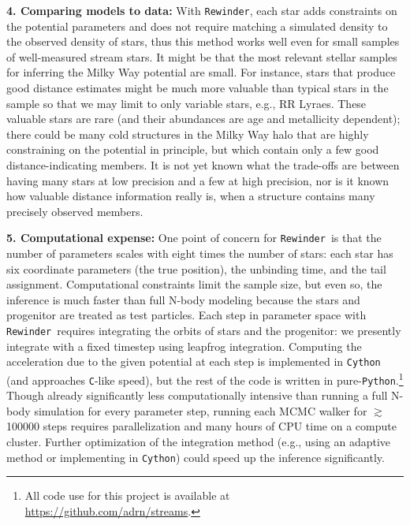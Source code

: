 \documentclass[letterpaper,12pt,preprint]{aastex}
\newcommand{\rewinder}{\texttt{Rewinder}}
\begin{document}
{\bf 4. Comparing models to data:} With \rewinder, each star adds constraints on the potential parameters and does not require matching a simulated density to the observed density of stars, thus this method works well even for small samples of well-measured stream stars. It might be that the most relevant stellar samples for inferring the Milky Way potential are small. For instance, stars that produce good distance estimates might be much more valuable than typical stars in the sample so that we may limit to only variable stars, e.g., RR Lyraes. These valuable stars are rare (and their abundances are age and metallicity dependent); there could be many cold structures in the Milky Way halo that are highly constraining on the potential in principle, but which contain only a few good distance-indicating members. It is not yet known what the trade-offs are between having many stars at low precision and a few at high precision, nor is it known how valuable distance information really is, when a structure contains many precisely observed members.

{\bf 5. Computational expense:} One point of concern for \rewinder\ is that the number of parameters scales with eight times the number of stars: each star has six coordinate parameters (the true position), the unbinding time, and the tail assignment. Computational constraints limit the sample size, but even so, the inference is much faster than full N-body modeling because the stars and progenitor are treated as test particles. Each step in parameter space with \rewinder\ requires integrating the orbits of stars and the progenitor: we presently integrate with a fixed timestep using leapfrog integration. Computing the acceleration due to the given potential at each step is implemented in \texttt{Cython} (and approaches \texttt{C}-like speed), but the rest of the code is written in pure-\texttt{Python}.\footnote{All code use for this project is available at \url{https://github.com/adrn/streams}.} Though already significantly less computationally intensive than running a full N-body simulation for every parameter step, running each MCMC walker for $\gtrsim$100000 steps requires parallelization and many hours of CPU time on a compute cluster. Further optimization of the integration method (e.g., using an adaptive method or implementing in \texttt{Cython}) could speed up the inference significantly. 
\end{document}
